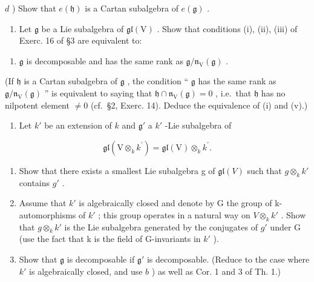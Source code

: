 \(d\) ) Show that \(e(\mathfrak{h})\) is a Cartan subalgebra of \(e(\mathfrak{g})\) .

\begin{enumerate}
\def\labelenumi{\arabic{enumi})}
\setcounter{enumi}{8}
\tightlist
\item
  Let \(\mathfrak{g}\) be a Lie subalgebra of \(\mathfrak{gl}(\mathrm{V})\) . Show that conditions (i), (ii), (iii) of Exerc. 16 of §3 are equivalent to:
\end{enumerate}

\begin{enumerate}
\def\labelenumi{(\alph{enumi})}
\setcounter{enumi}{21}
\tightlist
\item
  \(\mathfrak{g}\) is decomposable and has the same rank as \(\mathfrak{g} / \mathfrak{n}_{\mathrm{V}}(\mathfrak{g})\) .
\end{enumerate}

(If \(\mathfrak{h}\) is a Cartan subalgebra of \(\mathfrak{g}\) , the condition `` \(\mathfrak{g}\) has the same rank as \(\mathfrak{g}/\mathfrak{n}_{\mathrm{V}}(\mathfrak{g})\) '' is equivalent to saying that \(\mathfrak{h} \cap \mathfrak{n}_{\mathrm{V}}(\mathfrak{g}) = 0\) , i.e.~that \(\mathfrak{h}\) has no nilpotent element \(\neq 0\) (cf.~§2, Exerc. 14). Deduce the equivalence of (i) and (v).)

\begin{enumerate}
\def\labelenumi{\arabic{enumi})}
\setcounter{enumi}{9}
\tightlist
\item
  Let \(k'\) be an extension of \(k\) and \(\mathfrak{g}'\) a \(k'\) -Lie subalgebra of
\end{enumerate}

\[
\mathfrak {g l} (\mathrm{V} \otimes_ {k} k ^ {\prime}) = \mathfrak {g l} (\mathrm{V}) \otimes_ {k} k ^ {\prime}.
\]

\begin{enumerate}
\def\labelenumi{\alph{enumi})}
\item
  Show that there exists a smallest Lie subalgebra g of \(\mathfrak{gl}(V)\) such that \(g\otimes_{k}k'\) contains \(g'\) .
\item
  Assume that \(k'\) is algebraically closed and denote by G the group of k-automorphisms of \(k'\) ; this group operates in a natural way on \(V \otimes_{k} k'\) . Show that \(g \otimes_{k} k'\) is the Lie subalgebra generated by the conjugates of \(g'\) under G (use the fact that k is the field of G-invariants in \(k'\) ).
\item
  Show that \(\mathfrak{g}\) is decomposable if \(\mathfrak{g}'\) is decomposable. (Reduce to the case where \(k'\) is algebraically closed, and use \(b\) ) as well as Cor. 1 and 3 of Th. 1.)
\end{enumerate}

